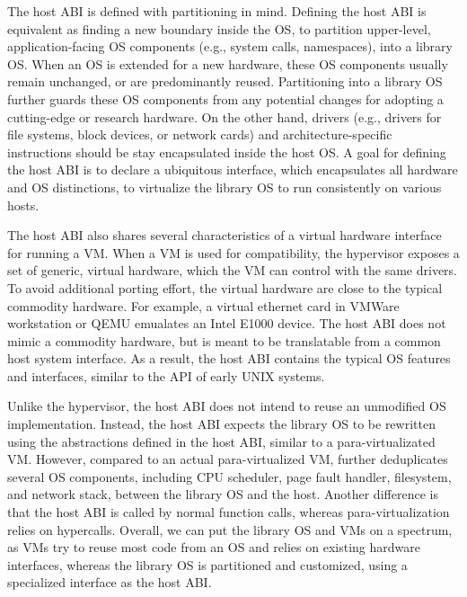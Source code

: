 The host ABI is defined with partitioning in mind.
Defining the host ABI 
is equivalent as finding a new boundary inside the OS,
to partition
upper-level, application-facing OS components (e.g., system calls, namespaces), into 
a library OS.
When an OS is extended for a new hardware,
these OS components usually remain unchanged, or are predominantly reused.
Partitioning
into a library OS further guards these OS components from any potential changes for adopting a cutting-edge or research hardware.
On the other hand,
drivers (e.g., drivers for file systems, block devices, or network cards)
and architecture-specific instructions
should be stay encapsulated inside the host OS.
A goal for defining the host ABI is to declare a ubiquitous interface,
which encapsulates all hardware and OS distinctions,
to virtualize the library OS to run consistently on various hosts.




The host ABI also shares several characteristics of a virtual hardware interface for running a VM.
When a VM is used for compatibility, the hypervisor exposes
a set of generic, virtual hardware,
which the VM can control with the same drivers.
To avoid additional porting effort, the virtual hardware are close to the typical commodity hardware.
For example, a virtual ethernet card in VMWare workstation or QEMU
emualates an Intel E1000 device.
The host ABI does not mimic a commodity hardware, but is meant to be translatable from a common host system interface. 
As a result, the host ABI contains the
typical OS features and interfaces, similar to the API of early UNIX systems.



Unlike the hypervisor, the host ABI does not intend to reuse an unmodified OS implementation.
Instead, the host ABI expects the library OS
to be rewritten using the abstractions defined in the host ABI,
similar to a 
para-virtualizated VM.
However, compared to an actual para-virtualized VM,
\graphene{} further deduplicates several OS components,
including CPU scheduler, page fault handler, filesystem, and network stack,
between the library OS and the host.
Another difference is that the host ABI is called by normal function calls, whereas para-virtualization relies on hypercalls.
Overall, we can put the \graphene{} library OS and VMs on a spectrum,
as VMs try to reuse most code from an OS and relies on existing hardware interfaces,
whereas the \graphene{} library OS
is partitioned and customized,
using a specialized interface as the host ABI.



